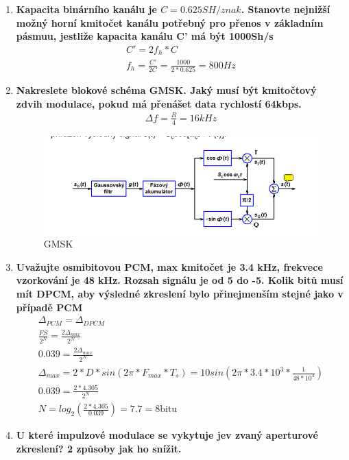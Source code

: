 \begin{enumerate}
    \item \textbf{Kapacita binárního kanálu je $C=0.625 SH/znak$. Stanovte nejnižší možný horní kmitočet kanálu potřebný pro přenos v základním pásmuu, jestliže kapacita kanálu C' má být 1000Sh/s}
    \begin{gather*}
        C'=2f_h*C \\
        f_h=\frac{C'}{2C}=\frac{1000}{2*0.625}=800 Hz
    \end{gather*}
    \item \textbf{Nakreslete blokové schéma GMSK. Jaký musí být kmitočtový zdvih modulace, pokud má přenášet data rychlostí 64kbps.}
    \begin{gather*}
        \Delta f= \frac{R}{4}=16 kHz
    \end{gather*}
    \begin{figure}[h!]
        \centering
        \includegraphics[scale=0.7]{images/GMSK.png}
        \caption{GMSK}
        \label{fig:enter-label}
    \end{figure}

    \item \textbf{Uvažujte osmibitovou PCM, max kmitočet je 3.4 kHz, frekvece vzorkování je 48 kHz. Rozsah signálu je od 5 do -5. Kolik bitů musí mít DPCM, aby výsledné zkreslení bylo přinejmenším stejné jako v případě PCM}
    \begin{gather*}
        \Delta_{PCM}=\Delta_{DPCM}\\
        \frac{FS}{2^N}=\frac{2\Delta_{max}}{2^N}\\
        0.039=\frac{2\Delta_{max}}{2^N}\\
        \Delta_{max}=2*D*sin(2\pi*F_{max}*T_s)=10sin(2\pi*3.4*10^3*\frac{1}{48*10^3})\\
        0.039=\frac{2*4.305}{2^N}\\
        N=log_2(\frac{2*4.305}{0.039})=7.7=8 \textrm{bitu}
    \end{gather*}

    \item \textbf{U které impulzové modulace se vykytuje jev zvaný aperturové zkreslení? 2 způsoby jak ho snížit.}
    

\end{enumerate}
